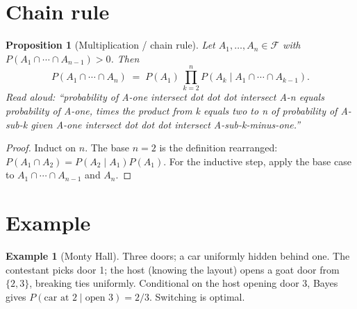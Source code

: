 \documentclass[11pt]{article}
\newtheorem{proposition}[theorem]{Proposition}
\theoremstyle{definition}
\newtheorem{example}[theorem]{Example}
\begin{document}
\section{Chain rule}

\begin{proposition}[Multiplication / chain rule]
Let $A_1, \ldots, A_n \in \mathcal{F}$ with $P(A_1 \cap \cdots \cap A_{n-1}) > 0$.
Then
\[
P(A_1 \cap \cdots \cap A_n) \;=\; P(A_1)\, \prod_{k=2}^{n} P(A_k \mid A_1 \cap \cdots \cap A_{k-1}).
\]
\emph{Read aloud:} ``probability of A-one intersect dot dot dot intersect A-n equals probability of A-one, times the product from k equals two to n of probability of A-sub-k given A-one intersect dot dot dot intersect A-sub-k-minus-one.''
\end{proposition}

\begin{proof}
Induct on $n$. The base $n = 2$ is the definition rearranged:
$P(A_1 \cap A_2) = P(A_2 \mid A_1) P(A_1)$. For the inductive step, apply
the base case to $A_1 \cap \cdots \cap A_{n-1}$ and $A_n$. \qedhere
\end{proof}

\section{Example}
\begin{example}[Monty Hall]
Three doors; a car uniformly hidden behind one. The contestant picks door 1;
the host (knowing the layout) opens a goat door from $\{2, 3\}$, breaking
ties uniformly. Conditional on the host opening door 3, Bayes gives
$P(\text{car at 2} \mid \text{open 3}) = 2/3$. Switching is optimal.
\end{example}
\end{document}
